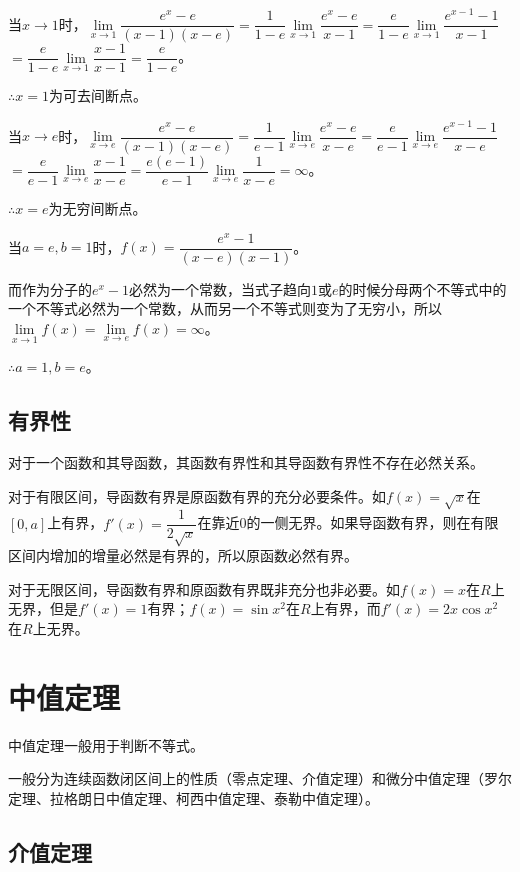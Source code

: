 当$x\to 1$时，$\lim\limits_{x\to 1}\dfrac{e^x-e}{(x-1)(x-e)}$$=\dfrac{1}{1-e}\lim\limits_{x\to 1}\dfrac{e^x-e}{x-1}$$=\dfrac{e}{1-e}\lim\limits_{x\to 1}\dfrac{e^{x-1}-1}{x-1}$$=\dfrac{e}{1-e}\lim\limits_{x\to 1}\dfrac{x-1}{x-1}$$=\dfrac{e}{1-e}$。\medskip

$\therefore x=1$为可去间断点。\medskip

    当$x\to e$时，$\lim\limits_{x\to e}\dfrac{e^x-e}{(x-1)(x-e)}$$=\dfrac{1}{e-1}\lim\limits_{x\to e}\dfrac{e^x-e}{x-e}$$=\dfrac{e}{e-1}\lim\limits_{x\to e}\dfrac{e^{x-1}-1}{x-e}$\medskip$=\dfrac{e}{e-1}\lim\limits_{x\to e}\dfrac{x-1}{x-e}$$=\dfrac{e(e-1)}{e-1}\lim\limits_{x\to e}\dfrac{1}{x-e}=\infty$。\medskip

$\therefore x=e$为无穷间断点。\medskip

    当$a=e,b=1$时，$f(x)=\dfrac{e^x-1}{(x-e)(x-1)}$。\medskip

    而作为分子的$e^x-1$必然为一个常数，当式子趋向$1$或$e$的时候分母两个不等式中的一个不等式必然为一个常数，从而另一个不等式则变为了无穷小，所以$\lim\limits_{x\to 1}f(x)=\lim\limits_{x\to e}f(x)=\infty$。

$\therefore a=1,b=e$。

\subsection{有界性}

对于一个函数和其导函数，其函数有界性和其导函数有界性不存在必然关系。

对于有限区间，导函数有界是原函数有界的充分必要条件。如$f(x)=\sqrt{x}$在$[0,a]$上有界，$f'(x)=\dfrac{1}{2\sqrt{x}}$在靠近0的一侧无界。如果导函数有界，则在有限区间内增加的增量必然是有界的，所以原函数必然有界。

对于无限区间，导函数有界和原函数有界既非充分也非必要。如$f(x)=x$在$R$上无界，但是$f'(x)=1$有界；$f(x)=\sin x^2$在$R$上有界，而$f'(x)=2x\cos x^2$在$R$上无界。

\section{中值定理}

中值定理一般用于判断不等式。

一般分为连续函数闭区间上的性质（零点定理、介值定理）和微分中值定理（罗尔定理、拉格朗日中值定理、柯西中值定理、泰勒中值定理）。

\subsection{介值定理}

